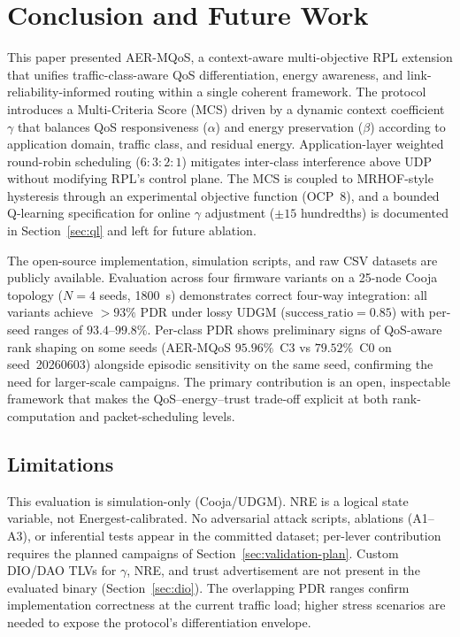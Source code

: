 \section{Conclusion and Future Work}
\label{sec:concl}

This paper presented AER-MQoS, a context-aware multi-objective RPL extension that unifies traffic-class-aware QoS differentiation, energy awareness, and link-reliability-informed routing within a single coherent framework. The protocol introduces a Multi-Criteria Score (MCS) driven by a dynamic context coefficient $\gamma$ that balances QoS responsiveness ($\alpha$) and energy preservation ($\beta$) according to application domain, traffic class, and residual energy. Application-layer weighted round-robin scheduling ($6{:}3{:}2{:}1$) mitigates inter-class interference above UDP without modifying RPL's control plane. The MCS is coupled to MRHOF-style hysteresis through an experimental objective function (OCP~8), and a bounded Q-learning specification for online $\gamma$ adjustment ($\pm15$ hundredths) is documented in Section~\ref{sec:ql} and left for future ablation.

The open-source implementation, simulation scripts, and raw CSV datasets are publicly available. Evaluation across four firmware variants on a 25-node Cooja topology ($N{=}4$ seeds, 1800~s) demonstrates correct four-way integration: all variants achieve $>93\%$ PDR under lossy UDGM ($\mathrm{success\_ratio}{=}0.85$) with per-seed ranges of $93.4$--$99.8\%$. Per-class PDR shows preliminary signs of QoS-aware rank shaping on some seeds (AER-MQoS $95.96\%$~C3 vs $79.52\%$~C0 on seed~20260603) alongside episodic sensitivity on the same seed, confirming the need for larger-scale campaigns. The primary contribution is an open, inspectable framework that makes the QoS--energy--trust trade-off explicit at both rank-computation and packet-scheduling levels.

\subsection{Limitations}
This evaluation is simulation-only (Cooja/UDGM). NRE is a logical state variable, not Energest-calibrated. No adversarial attack scripts, ablations (A1--A3), or inferential tests appear in the committed dataset; per-lever contribution requires the planned campaigns of Section~\ref{sec:validation-plan}. Custom DIO/DAO TLVs for $\gamma$, NRE, and trust advertisement are not present in the evaluated binary (Section~\ref{sec:dio}). The overlapping PDR ranges confirm implementation correctness at the current traffic load; higher stress scenarios are needed to expose the protocol's differentiation envelope.

